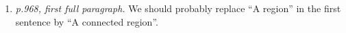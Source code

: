\documentclass[12 pt]{amsart}
\begin{document}
\begin{enumerate}
    \item  \emph{p.968, first full paragraph.}  We should probably replace ``A region'' in the first sentence by ``A connected region''.  \\
    
    
\end{enumerate}
\end{document}
